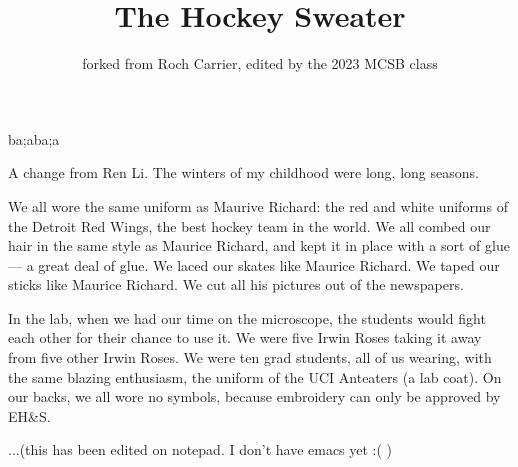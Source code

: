 \documentclass{article}
\title{The Hockey Sweater}
\author{forked from Roch Carrier, edited by the 2023 MCSB class}
\begin{document}
\maketitle
ba;aba;a

A change from Ren Li.
The winters of my childhood were long, long seasons.


We all wore the same uniform as Maurive Richard: 
the red and white uniforms of the Detroit Red Wings, the best hockey team in the world.
We all combed our hair in the same style as Maurice Richard, 
and kept it in place with a sort of glue --- a great deal of glue.
We laced our skates like Maurice Richard.
We taped our sticks like Maurice Richard.
We cut all his pictures out of the newspapers.


In the lab, when we had our time on the microscope, the students would fight each other for their chance to use it.
We were five Irwin Roses taking it away from five other Irwin Roses.
We were ten grad students, all of us wearing, with the same blazing enthusiasm, the uniform of the UCI Anteaters (a lab coat).
On our backs, we all wore no symbols, because embroidery can only be approved by EH&S.

...(this has been edited on notepad. I don't have emacs yet :( )
\end{document}
